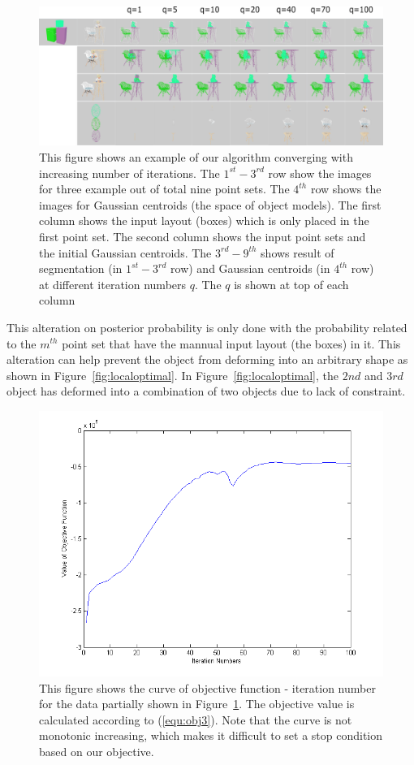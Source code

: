 \begin{figure}
	\centering
	\includegraphics[width=\linewidth]{images/Initialization/iters}
	\caption{\label{fig:iter}This figure shows an example of our algorithm converging with increasing number of iterations. The $1^{st}-3^{rd}$ row show the images for three example out of total nine point sets. The $4^{th}$ row shows the images for Gaussian centroids (the space of object models). The first column shows the input layout (boxes) which is only placed in the first point set. The second column shows the input point sets and the initial Gaussian centroids. The $3^{rd}-9^{th}$ shows result of segmentation (in $1^{st}-3^{rd}$ row) and Gaussian centroids (in $4^{th}$ row) at different iteration numbers $q$. The $q$ is shown at top of each column}
\end{figure}
This alteration on posterior probability is only done with the probability related to the $m^{th}$ point set that have the mannual input layout (the boxes) in it. This alteration can help prevent the object from deforming into an arbitrary shape as shown in Figure~\ref{fig:localoptimal}. In Figure~\ref{fig:localoptimal}, the $2nd$ and $3rd$ object has deformed into a combination of two objects due to lack of constraint.
\begin{figure}
	\centering
	\includegraphics[width=\linewidth]{images/Initialization/obj_iter.png}
	\caption{\label{fig:iter_curve}This figure shows the curve of objective function - iteration number for the data partially shown in Figure~\ref{fig:iter}. The objective value is calculated according to (\ref{equ:obj3}). Note that the curve is not monotonic increasing, which makes it difficult to set a stop condition based on our objective.}
\end{figure}

